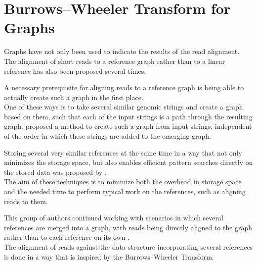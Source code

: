 \documentclass[a4paper,12pt,twoside,BCOR=10mm]{scrbook}
\begin{document}
\section{Burrows--Wheeler Transform for Graphs}

Graphs have not only been used to indicate the results of the read alignment. 
The alignment of short reads to a reference graph rather than to a linear reference has 
also been proposed several times.

A necessary prerequisite for aligning reads to a reference graph is 
being able to actually create such a graph in the first place. \\
One of these ways is to take several similar genomic strings and create a graph based 
on them, such that each of the input strings is a path through the resulting graph. 
\citet{Lee2002} proposed a method to create such a graph from input strings, 
independent of the order in which these strings 
are added to the emerging graph.

Storing several very similar references at the same time in a way that not only minimizes 
the storage space, but also enables efficient pattern searches directly on the 
stored data was proposed by \citet{Makinen2010}. \\
The aim of these techniques is to 
minimize both the overhead in storage space and the needed time to perform typical work 
on the references, such as aligning reads to them.

This group of authors continued working with scenarios in which 
several references are merged into a graph, with reads being directly 
aligned to the graph rather than to each reference on its own \citep{Siren2014}. \\
The alignment of reads against the data structure incorporating several references 
is done in a way that is inspired by the Burrows--Wheeler Transform. \\
\end{document}
